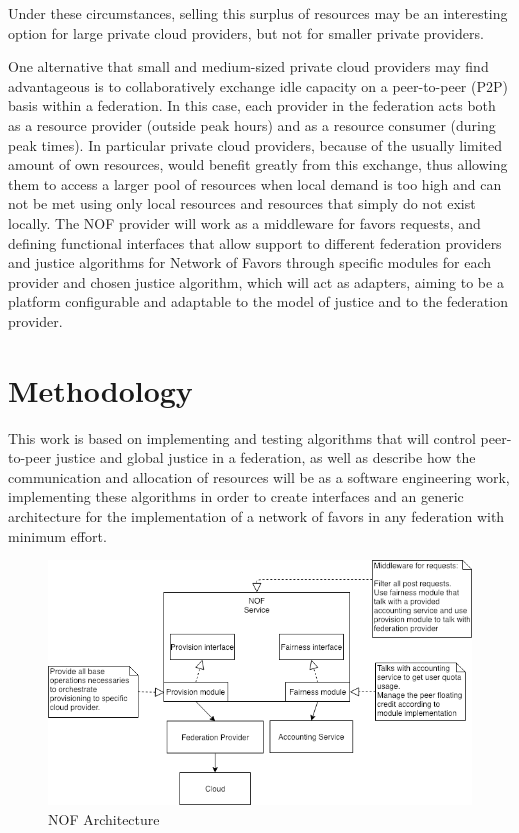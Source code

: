 \documentclass[acmsmall]{acmart}
\begin{document}
Under these circumstances, selling this surplus of resources may be an interesting option for large private cloud providers, but not for smaller private providers.

One alternative that small and medium-sized private cloud providers may find advantageous is to collaboratively exchange idle capacity on a peer-to-peer (P2P) basis within a federation. In this case, each provider in the federation acts both as a resource provider (outside peak hours) and as a resource consumer (during peak times). In particular private cloud providers, because of the usually limited amount of own resources, would benefit greatly from this exchange\cite{fairness-benefices}, thus allowing them to access a larger pool of resources when local demand is too high and can not be met using only local resources and resources that simply do not exist locally.
The NOF\cite{nof} provider will work as a middleware for favors requests, and defining functional  interfaces  that  allow  support  to  different  federation  providers  and  justice  algorithms  for  Network  of  Favors  through  specific  modules  for  each  provider  and  chosen justice algorithm, which will act as adapters, aiming to be a platform configurable and adaptable to the model of justice and to the federation provider.

\section{Methodology}

This work is based on implementing and testing algorithms that will control peer-to-peer justice and global justice in a federation, as well as describe how the communication and allocation of resources will be as a software engineering work, implementing these algorithms in order to create interfaces and an generic architecture for the implementation of a network of favors in any federation with minimum effort.

\begin{figure}[h]
  \centering
  \includegraphics[width=\linewidth]{NOF-architecture-generic}
  \caption{NOF Architecture}
\end{figure}
\end{document}
